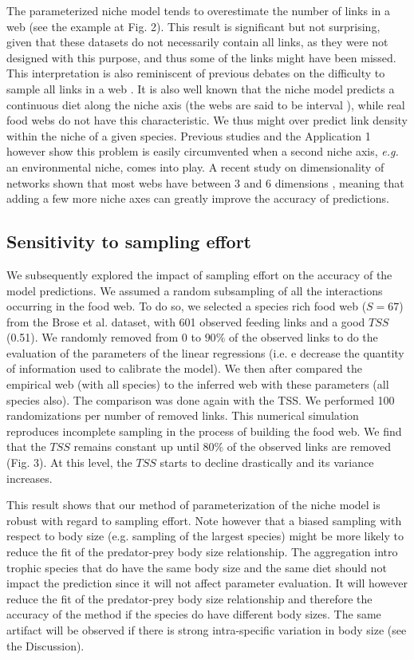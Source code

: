 \documentclass[12pt]{article}
\begin{document}
The parameterized niche model tends to overestimate the number of links in a web
(see the example at Fig. 2). This result is significant but not surprising,
given that these datasets do not necessarily contain all links, as they were not
designed with this purpose, and thus some of the links might have been missed.
This interpretation is also reminiscent of previous debates on the difficulty to
sample all links in a web \parencite{Martinez1999}. It is also well known that
the niche model predicts a continuous diet along the niche axis (the webs are
said to be interval \parencite{Cohen1990, Stouffer2006}), while real food webs
do not have this characteristic. We thus might over predict link density within
the niche of a given species. Previous studies \parencite{Allesina2008} and the
Application 1 however show this problem is easily circumvented when a second
niche axis, \emph{e.g.} an environmental niche, comes into play. A recent study
on dimensionality of networks shown that most webs have between 3 and 6
dimensions \parencite{Eklof2013}, meaning that adding a few more niche axes can
greatly improve the accuracy of predictions.

\subsection{Sensitivity to sampling effort}
We subsequently explored the impact of sampling effort on the accuracy of the
model predictions. We assumed a random subsampling of all the interactions
occurring in the food web. To do so, we selected a species rich food web ($S =
67$) from the Brose et al. dataset, with 601 observed feeding links and a good
$TSS$ (0.51). We randomly removed from 0 to $90\%$ of the observed links to do
the evaluation of the parameters of the linear regressions (i.e. e decrease the
quantity of information used to calibrate the model). We then after compared the
empirical web (with all species) to the inferred web with these parameters (all
species also). The comparison was done again with the TSS. We performed 100
randomizations per number of removed links. This numerical simulation reproduces
incomplete sampling in the process of building the food web. We find that the
$TSS$ remains constant up until $80\%$ of the observed links are removed (Fig.
3). At this level, the $TSS$ starts to decline drastically and its variance
increases.

This result shows that our method of parameterization of the niche model is
robust with regard to sampling effort. Note however that a biased sampling with
respect to body size (e.g. sampling of the largest species) might be more likely
to reduce the fit of the predator-prey body size relationship. The aggregation
intro trophic species that do have the same body size and the same diet should
not impact the prediction since it will not affect parameter evaluation. It will
however reduce the fit of the predator-prey body size relationship and therefore
the accuracy of the method if the species do have different body sizes. The same
artifact will be observed if there is strong intra-specific variation in body
size (see the Discussion).
\end{document}
